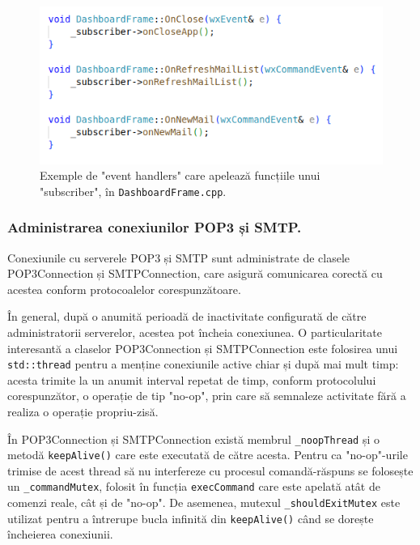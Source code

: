 \documentclass[runningheads]{llncs}
\begin{document}
\begin{figure}
    \centering
    \includegraphics[width=\textwidth]{subscriberFxns.png}
    \caption{Exemple de "event handlers" care apelează funcțiile unui "subscriber", în \texttt{DashboardFrame.cpp}.}
    \label{fig:subscribers}
\end{figure}


\newpage

\subsubsection{Administrarea conexiunilor POP3 și SMTP.}

Conexiunile cu serverele POP3 și SMTP sunt administrate de clasele POP3Connection și SMTPConnection, care asigură comunicarea corectă cu acestea conform protocoalelor corespunzătoare. 

În general, după o anumită perioadă de inactivitate configurată de către administratorii serverelor, acestea pot încheia conexiunea. O particularitate interesantă a claselor POP3Connection și SMTPConnection este folosirea unui \texttt{std::thread} pentru a menține conexiunile active chiar și după mai mult timp: acesta trimite la un anumit interval repetat de timp, conform protocolului corespunzător, o operație de tip "no-op", prin care să semnaleze activitate fără a realiza o operație propriu-zisă.

În POP3Connection și SMTPConnection există membrul \texttt{\_noopThread} și o metodă \texttt{keepAlive()} care este executată de către acesta. Pentru ca "no-op"-urile trimise de acest thread să nu interfereze cu procesul comandă-răspuns se folosește un \texttt{\_commandMutex}, folosit în funcția \texttt{execCommand} care este apelată atât de comenzi reale, cât și de "no-op". De asemenea, mutexul \texttt{\_shouldExitMutex} este utilizat pentru a întrerupe bucla infinită din \texttt{keepAlive()} când se dorește încheierea conexiunii.
\end{document}
